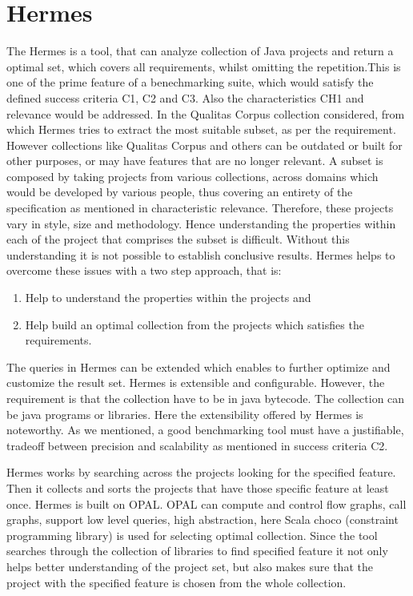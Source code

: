 \documentclass[authoryear,preprint]{sigplanconf}
\begin{document}
\section{Hermes}
\label{sec:sec_hermes}
The Hermes\cite{Reif:2017:HAC:3088515.3088523} is a tool, that can analyze collection of Java projects and return a optimal set, which covers all requirements, whilst omitting the repetition.This is one of the prime feature of a benechmarking suite, which would satisfy the defined success criteria C1, C2 and C3. Also the characteristics CH1 and relevance would be addressed. In the Qualitas Corpus\cite{5693210} \cite{Dingsoyr:2013:RCL:2507288.2507322} collection considered, from which Hermes tries to extract the most suitable subset, as per the requirement. However collections like Qualitas Corpus and others can be outdated or built for other purposes, or may have features that are no longer relevant. A subset is composed by taking projects from various collections, across domains which would be developed by various people, thus covering an entirety of the specification as mentioned in characteristic relevance. Therefore, these projects vary in style, size and methodology. Hence understanding the properties within each of the project that comprises the subset is difficult. Without this understanding it is not possible to establish conclusive results. Hermes helps to overcome these issues with a two step approach, that is:

\begin{enumerate}
	\item Help to understand the properties within the projects and 
	\item Help build an optimal collection from the projects which satisfies the requirements.
\end{enumerate}

The queries in Hermes can be extended which enables to further optimize and customize the result set. Hermes is extensible and configurable. However, the requirement is that the collection have to be in java bytecode. The collection can be java programs or libraries. Here the extensibility offered by Hermes is noteworthy. As we mentioned, a good benchmarking tool must have a justifiable, tradeoff between precision and scalability as mentioned in success criteria C2. 

Hermes works by searching across the projects looking for the specified feature. Then it collects and sorts the projects that have those specific feature at least once. Hermes is built on OPAL. OPAL can compute and control flow graphs, call graphs, support low level queries, high abstraction, here Scala choco (constraint programming library) is used for selecting optimal collection. Since the tool searches through the collection of libraries to find specified feature it not only helps better understanding of the project set, but also makes sure that the project with the specified feature is chosen from the whole collection.
\end{document}
